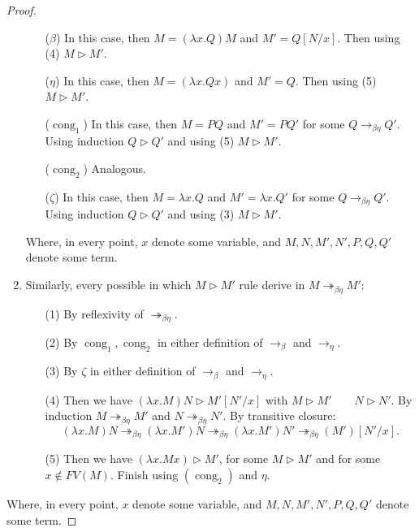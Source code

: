 \begin{proof}
\begin{enumerate}
    \begin{itemize}
    \item[($\beta$)] In this case, then $M=(\lambda x.Q)M$ and $M' = Q[N/x]$. Then using (4) $M \triangleright M'$.
    \item[($\eta$)] In this case, then $M=(\lambda x.Qx)$ and $M' = Q$. Then using (5) $M \triangleright M'$.
    \item[($\operatorname{cong}_1$)] In this case, then $M=PQ$ and $M' = PQ'$ for some $Q\to_{\beta\eta} Q'$. Using induction $Q\triangleright Q'$ and using (5) $M \triangleright M'$. 
    \item[($\operatorname{cong}_2$)]  Analogous.
    \item[($\zeta$)] In this case, then $M=\lambda x.Q$ and $M' = \lambda x.Q'$ for some $Q\to_{\beta\eta} Q'$. Using induction $Q\triangleright Q'$ and using (3) $M \triangleright M'$.  
    \end{itemize}
    Where, in every point, $x$ denote some variable, and $M,N,M',N',P,Q,Q'$ denote some term.
  \item Similarly, every possible in which $M\triangleright M'$ rule derive in  $M \twoheadrightarrow_{\beta\eta} M'$:
    \begin{itemize}
    \item[(1)] By reflexivity of $ \twoheadrightarrow_{\beta\eta}$.
    \item[(2)] By $\operatorname{cong}_1,\operatorname{cong}_2$ in either definition of $\to_\beta$ and $\to_\eta$.
    \item[(3)] By $\zeta$ in either definition of $\to_\beta$ and $\to_\eta$.
    \item[(4)] Then we have $(\lambda x.M)N \triangleright M'[N'/x]$ with $M \triangleright M'\qquad N \triangleright N'$. By induction $M \twoheadrightarrow_{\beta\eta} M'$ and $N \twoheadrightarrow_{\beta\eta} N'$. By transitive closure:
      $$(\lambda x.M)N \twoheadrightarrow_{\beta\eta}(\lambda x.M')N \twoheadrightarrow_{\beta\eta} (\lambda x.M')N' \twoheadrightarrow_{\beta\eta} (M')[N'/x].$$
    \item[(5)] Then we have $(\lambda x.Mx) \triangleright M'$, for some $M\triangleright M'$ and for some $x \not  \in FV(M)$. Finish using $(\operatorname{cong}_2)$ and $\eta$.
    \end{itemize}

  \end{enumerate}
  Where, in every point, $x$ denote some variable, and $M,N,M',N',P,Q,Q'$ denote some term.
\end{proof}

